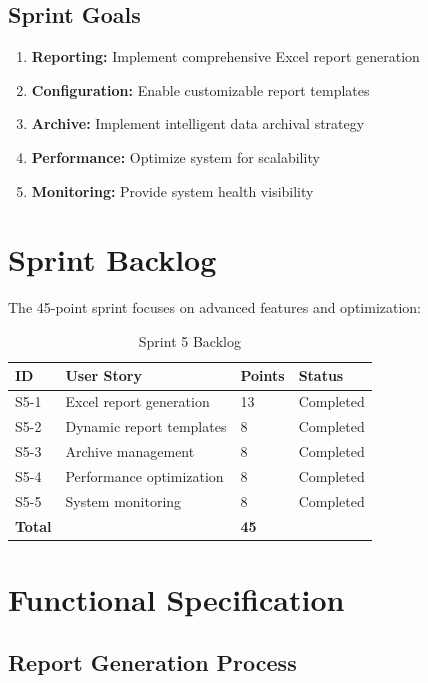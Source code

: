 \subsection{Sprint Goals}

\begin{enumerate}
\item \textbf{Reporting:} Implement comprehensive Excel report generation
\item \textbf{Configuration:} Enable customizable report templates
\item \textbf{Archive:} Implement intelligent data archival strategy
\item \textbf{Performance:} Optimize system for scalability
\item \textbf{Monitoring:} Provide system health visibility
\end{enumerate}

\section{Sprint Backlog}

The 45-point sprint focuses on advanced features and optimization:

\begin{table}[H]
\centering
\caption{Sprint 5 Backlog}
\label{tab:sprint5_backlog}
\begin{tabularx}{\textwidth}{|l|X|l|l|}
\hline
\textbf{ID} & \textbf{User Story} & \textbf{Points} & \textbf{Status} \\
\hline
S5-1 & Excel report generation & 13 & Completed \\
\hline
S5-2 & Dynamic report templates & 8 & Completed \\
\hline
S5-3 & Archive management & 8 & Completed \\
\hline
S5-4 & Performance optimization & 8 & Completed \\
\hline
S5-5 & System monitoring & 8 & Completed \\
\hline
\textbf{Total} & & \textbf{45} & \\
\hline
\end{tabularx}
\end{table}

\section{Functional Specification}

\subsection{Report Generation Process}

